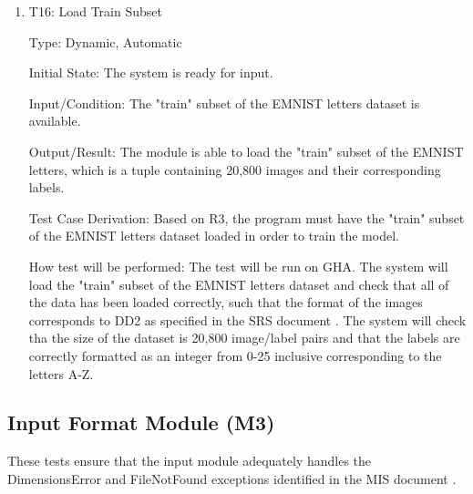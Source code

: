 \documentclass[12pt, titlepage]{article}
\begin{document}
\begin{enumerate}

\item{T16: Load Train Subset\\}

Type: Dynamic, Automatic

Initial State: The \progname{} system is ready for input.

Input/Condition: The "train" subset of the EMNIST letters dataset is available.

Output/Result: The module is able to load the "train" subset of the EMNIST
letters, which is a tuple containing 20,800 images and their corresponding
labels.

Test Case Derivation: Based on R3, the program must have the "train" subset
of the EMNIST letters dataset loaded in order to train the model.

How test will be performed: The test will be run on GHA. The system will load the
"train" subset of the EMNIST letters dataset and check that all of the
data has been loaded correctly, such that the format of the images corresponds
to DD2 as specified in the SRS document \citep{SRS}. The system will check tha
the size of the dataset is 20,800 image/label pairs and that the labels are
correctly formatted as an integer from 0-25 inclusive corresponding to the
letters A-Z.

\end{enumerate}

\subsection{Input Format Module (M3)}

These tests ensure that the input module adequately handles the DimensionsError
and FileNotFound exceptions identified in the MIS document \citep{MIS}.
\end{document}
